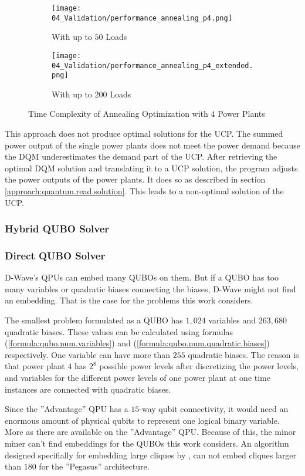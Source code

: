 \begin{figure}
  \begin{subfigure}[b]{0.5 \textwidth}
    \centering
    \texttt{[image: 04\_Validation/performance\_annealing\_p4.png]}
    \caption{With up to $50$ Loads}
    \label{figure:validation.annealing.performance}
  \end{subfigure}
  \begin{subfigure}[b]{0.5 \textwidth}
    \centering
    \texttt{[image: 04\_Validation/performance\_annealing\_p4\_extended.png]}
    \caption{With up to $200$ Loads}
    \label{figure:validation.annealin.performance.extended}
  \end{subfigure}
  \caption{Time Complexity of Annealing Optimization with $4$ Power Plants}
\end{figure}

This approach does not produce optimal solutions for the UCP.
The summed power output of the single power plants does not meet the power demand because the DQM underestimates the demand part of the UCP.
After retrieving the optimal DQM solution and translating it to a UCP solution, the program adjusts the power outputs of the power plants.
It does so as described in section \ref{approach:quantum.read.solution}.
This leads to a non-optimal solution of the UCP.

\subsubsection{Hybrid QUBO Solver}


\subsubsection{Direct QUBO Solver}

D-Wave's QPUs can embed many QUBOs on them.
But if a QUBO has too many variables or quadratic biases connecting the biases, D-Wave might not find an embedding.
That is the case for the problems this work considers.

The smallest problem formulated as a QUBO has $1, 024$ variables and $263, 680$ quadratic biases.
These values can be calculated using formulas (\ref{formula:qubo.num.variables}) and (\ref{formula:qubo.num.quadratic.biases}) respectively.
One variable can have more than $255$ quadratic biases.
The reason is that power plant $4$ has $2^8$ possible power levels after discretizing the power levels, and variables for the different power levels of one power plant at one time instances are connected with quadratic biases.

Since the ''Advantage'' QPU has a $15$-way qubit connectivity, it would need an enormous amount of physical qubits to represent one logical binary variable.
More as there are available on the ''Advantage'' QPU.
\cite{D-Wave2020, Zbinden2020}
Because of this, the minor miner can't find embeddings for the QUBOs this work considers.
An algorithm designed specifially for embedding large cliques by \citeauthor{Zbinden2020}, can not embed cliques larger than $180$ for the ''Pegasus'' architecture.
\cite{Zbinden2020}
